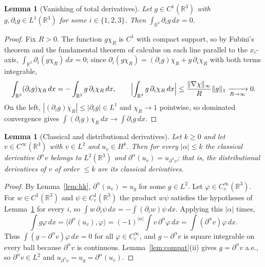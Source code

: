 \documentclass[11pt]{article}
\newtheorem{lemma}[theorem]{Lemma}
\theoremstyle{definition}
\theoremstyle{plain}
\newcommand{\R}{\mathbb R}
\begin{document}
\begin{lemma}[Vanishing of total derivatives]\label{lem:div-zero}
Let $g\in C^1(\R^3)$ with $g,\partial_ig\in L^1(\R^3)$ for some
$i\in\{1,2,3\}$.  Then $\int_{\R^3}\partial_ig\,dx=0$.
\end{lemma}

\begin{proof}
Fix $R>0$.  The function $g\chi_R$ is $C^1$ with compact support, so by
Fubini's theorem and the fundamental theorem of calculus on each line
parallel to the $x_i$-axis, $\int_{\R^3}\partial_i(g\chi_R)\,dx=0$; since
$\partial_i(g\chi_R)=(\partial_ig)\chi_R+g\,\partial_i\chi_R$ with both
terms integrable,
\[
 \int_{\R^3}(\partial_ig)\chi_R\,dx=-\int_{\R^3}g\,\partial_i\chi_R\,dx,
 \qquad
 \Bigl|\int_{\R^3}g\,\partial_i\chi_R\,dx\Bigr|
 \le\frac{\|\nabla\chi\|_\infty}{R}\|g\|_1\xrightarrow[R\to\infty]{}0.
\]
On the left, $|(\partial_ig)\chi_R|\le|\partial_ig|\in L^1$ and
$\chi_R\to1$ pointwise, so dominated convergence gives
$\int(\partial_ig)\chi_R\,dx\to\int\partial_ig\,dx$.
\end{proof}

\begin{lemma}[Classical and distributional derivatives]\label{lem:classical}
Let $k\ge0$ and let $v\in C^\infty(\R^3)$ with $v\in L^2$ and
$u_v\in H^k$.  Then for every $|\alpha|\le k$ the classical derivative
$\partial^\alpha v$ belongs to $L^2(\R^3)$ and
$\partial^\alpha(u_v)=u_{\partial^\alpha v}$; that is, the distributional
derivatives of $v$ of order $\le k$ are its classical derivatives.
\end{lemma}

\begin{proof}
By Lemma~\ref{lem:hk}, $\partial^\alpha(u_v)=u_g$ for some $g\in L^2$.  Let
$\varphi\in C_c^\infty(\R^3)$.  For $w\in C^1(\R^3)$ and $\psi\in C_c^1(\R^3)$
the product $w\psi$ satisfies the hypotheses of Lemma~\ref{lem:div-zero}
for every $i$, so $\int w\,\partial_i\psi\,dx=-\int(\partial_iw)\psi\,dx$.
Applying this $|\alpha|$ times,
\[
 \int g\varphi\,dx=\langle\partial^\alpha(u_v),\varphi\rangle
 =(-1)^{|\alpha|}\int v\,\partial^\alpha\varphi\,dx
 =\int(\partial^\alpha v)\varphi\,dx .
\]
Thus $\int(g-\partial^\alpha v)\varphi\,dx=0$ for all $\varphi\in C_c^\infty$,
and $g-\partial^\alpha v$ is square integrable on every ball because
$\partial^\alpha v$ is continuous.  Lemma~\ref{lem:compat}(ii) gives
$g=\partial^\alpha v$ a.e., so $\partial^\alpha v\in L^2$ and
$u_{\partial^\alpha v}=u_g=\partial^\alpha(u_v)$.
\end{proof}
\end{document}
